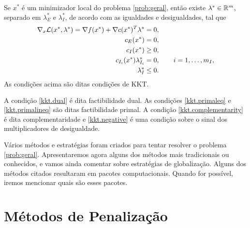 \begin{theorem}[KKT]
  Se $x^*$ é um minimizador local do problema \eqref{prob:geral}, então existe
  $\lambda^* \in \mathbb{R}^{m}$, separado em $\lambda_E^*$ e $\lambda_I^*$, de acordo
  com as igualdades e desigualdades, tal que
  \begin{subequations}\visiblelbl{kkt}
  \begin{align}
    \nabla_x \mathcal{L}(x^*,\lambda^*) = 
    \nabla f(x^*) + \nabla c(x^*)^T\lambda^* & = 0,
      \visiblelbl{kkt.dual} \\
    c_E(x^*) & = 0,
      \visiblelbl{kkt.primaleq} \\
    c_I(x^*) & \geq 0,
      \visiblelbl{kkt.primalineq} \\
    c_{I_i}(x^*)\lambda_{I_i}^* & = 0, \qquad i = 1,\dots,m_I,
      \visiblelbl{kkt.complementarity} \\
    \lambda_I^* & \leq 0.
      \visiblelbl{kkt.negative} 
  \end{align}
  \end{subequations}
  As condições acima são ditas condições de KKT. 
\end{theorem}
A condição \eqref{kkt.dual} é dita factibilidade dual. As condições
\eqref{kkt.primaleq} e \eqref{kkt.primalineq} são ditas factibilidade primal. A
condição \eqref{kkt.complementarity} é dita complementaridade e
\eqref{kkt.negative} é uma condição sobre o sinal dos multiplicadores de
desigualdade.

Vários métodos e estratégias foram criados para tentar resolver o problema
\eqref{prob:geral}.
Apresentaremos agora alguns dos métodos mais tradicionais ou conhecidos, e
vamos ainda comentar sobre estratégias de globalização. Alguns dos métodos
citados resultaram em pacotes computacionais. Quando for possível, iremos
mencionar quais são esses pacotes.

\section{Métodos de Penalização}

